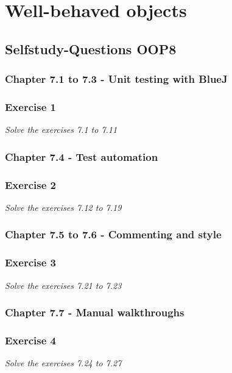 \section{Well-behaved objects}


\subsection{Selfstudy-Questions OOP8}

\subsubsection{Chapter 7.1 to 7.3 - Unit testing with BlueJ}

\subsubsection*{Exercise 1}
\textit{Solve the exercises 7.1 to 7.11} \\

\subsubsection{Chapter 7.4 - Test automation}

\subsubsection*{Exercise 2}
\textit{Solve the exercises 7.12 to 7.19} \\

\subsubsection{Chapter 7.5 to 7.6 - Commenting and style}

\subsubsection*{Exercise 3}
\textit{Solve the exercises 7.21 to 7.23} \\

\subsubsection{Chapter 7.7 - Manual walkthroughs}

\subsubsection*{Exercise 4}
\textit{Solve the exercises 7.24 to 7.27}

